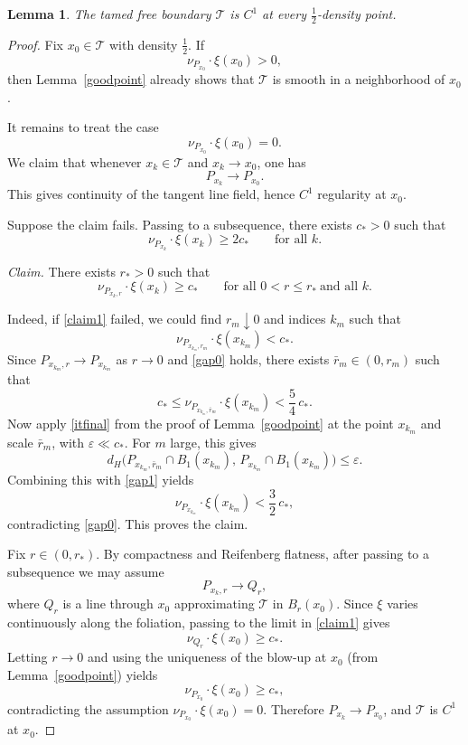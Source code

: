\documentclass[reqno,11pt]{amsart}
\makeatletter
\newtheorem{lem}[thm]{Lemma}%
\numberwithin{equation}{section}
\theoremstyle{remark}
\makeatother
\begin{document}
\begin{lem}\label{T-C1}
The tamed free boundary $\mathcal T$ is $C^1$ at every $\frac12$-density point.
\end{lem}

\begin{proof}
Fix $x_0\in\mathcal T$ with density $\frac12$.
If
\[
\nu_{P_{x_0}}\cdot\xi(x_0)>0,
\]
then Lemma~\ref{goodpoint} already shows that $\mathcal T$ is smooth in a neighborhood of $x_0$.

It remains to treat the case
\[
\nu_{P_{x_0}}\cdot\xi(x_0)=0.
\]
We claim that whenever $x_k\in\mathcal T$ and $x_k\to x_0$, one has
\[
P_{x_k}\to P_{x_0}.
\]
This gives continuity of the tangent line field, hence $C^1$ regularity at $x_0$.

Suppose the claim fails. Passing to a subsequence, there exists $c_\ast>0$ such that
\begin{equation}\label{gap0}
\nu_{P_{x_k}}\cdot\xi(x_k)\ge 2c_\ast
\qquad\text{for all }k.
\end{equation}

\medskip
\noindent\emph{Claim.}
There exists $r_\ast>0$ such that
\begin{equation}\label{claim1}
\nu_{P_{x_k,r}}\cdot\xi(x_k)\ge c_\ast
\qquad\text{for all }0<r\le r_\ast\ \text{and all }k.
\end{equation}

\noindent
Indeed, if \eqref{claim1} failed, we could find $r_m\downarrow0$ and indices $k_m$ such that
\[
\nu_{P_{x_{k_m},r_m}}\cdot\xi(x_{k_m})<c_\ast.
\]
Since $P_{x_{k_m},r}\to P_{x_{k_m}}$ as $r\to0$ and \eqref{gap0} holds, there exists
$\bar r_m\in(0,r_m)$ such that
\begin{equation}\label{gap1}
c_\ast\le \nu_{P_{x_{k_m},\bar r_m}}\cdot\xi(x_{k_m})<\frac54\,c_\ast.
\end{equation}
Now apply \eqref{itfinal} from the proof of Lemma~\ref{goodpoint} at the point $x_{k_m}$ and
scale $\bar r_m$, with $\varepsilon\ll c_\ast$.
For $m$ large, this gives
\[
d_H\bigl(P_{x_{k_m},\bar r_m}\cap B_1(x_{k_m}),\,P_{x_{k_m}}\cap B_1(x_{k_m})\bigr)\le \varepsilon.
\]
Combining this with \eqref{gap1} yields
\[
\nu_{P_{x_{k_m}}}\cdot\xi(x_{k_m})<\frac32\,c_\ast,
\]
contradicting \eqref{gap0}. This proves the claim.

\medskip
Fix $r\in(0,r_\ast)$. By compactness and Reifenberg flatness, after passing to a subsequence
we may assume
\[
P_{x_k,r}\to Q_r,
\]
where $Q_r$ is a line through $x_0$ approximating $\mathcal T$ in $B_r(x_0)$.
Since $\xi$ varies continuously along the foliation,
passing to the limit in \eqref{claim1} gives
\[
\nu_{Q_r}\cdot\xi(x_0)\ge c_\ast.
\]
Letting $r\to0$ and using the uniqueness of the blow-up at $x_0$
(from Lemma~\ref{goodpoint}) yields
\[
\nu_{P_{x_0}}\cdot\xi(x_0)\ge c_\ast,
\]
contradicting the assumption $\nu_{P_{x_0}}\cdot\xi(x_0)=0$.
Therefore $P_{x_k}\to P_{x_0}$, and $\mathcal T$ is $C^1$ at $x_0$.
\end{proof}
\end{document}
